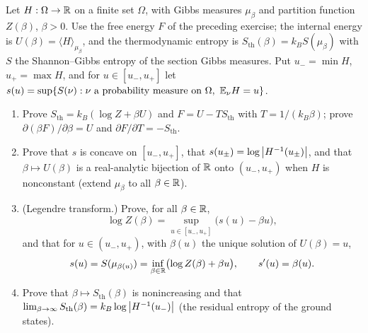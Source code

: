 \begin{exercise}
Let $H:\Omega\to\mathbb R$ on a finite set $\Omega$, with Gibbs measures
$\mu_\beta$ and partition function $Z(\beta)$, $\beta>0$.  Use the free energy $F$ of the preceding exercise; the internal energy is
$U(\beta)=\langle H\rangle_{\mu_\beta}$, and the thermodynamic entropy is
$S_{\mathrm{th}}(\beta)=k_BS(\mu_\beta)$ with $S$ the Shannon--Gibbs entropy
of the section Gibbs measures.  Put $u_-=\min H$, $u_+=\max H$, and for
$u\in[u_-,u_+]$ let
$s(u)=\sup\{S(\nu):\nu\text{ a probability measure on }\Omega,\ \mathbb E_\nu H=u\}$.
\begin{enumerate}[label=(\alph*)]
\item Prove $S_{\mathrm{th}}=k_B(\log Z+\beta U)$ and $F=U-TS_{\mathrm{th}}$
with $T=1/(k_B\beta)$; prove $\partial(\beta F)/\partial\beta=U$ and
$\partial F/\partial T=-S_{\mathrm{th}}$.
\item Prove that $s$ is concave on $[u_-,u_+]$, that $s(u_\pm)=\log\left\lvert H^{-1}(u_\pm)\right\rvert$,
and that $\beta\mapsto U(\beta)$ is a real-analytic bijection of $\mathbb R$ onto
$(u_-,u_+)$ when $H$ is nonconstant (extend $\mu_\beta$ to all $\beta\in\mathbb R$).
\item (Legendre transform.)  Prove, for all $\beta\in\mathbb R$,
\[
 \log Z(\beta)=\sup_{u\in[u_-,u_+]}\bigl(s(u)-\beta u\bigr),
\]
and that for $u\in(u_-,u_+)$, with $\beta(u)$ the unique solution of
$U(\beta)=u$,
\[
 s(u)=S(\mu_{\beta(u)})=\inf_{\beta\in\mathbb R}\bigl(\log Z(\beta)+\beta u\bigr),
 \qquad s'(u)=\beta(u).
\]
\item Prove that $\beta\mapsto S_{\mathrm{th}}(\beta)$ is nonincreasing and
that $\lim_{\beta\to\infty}S_{\mathrm{th}}(\beta)=k_B\log\left\lvert H^{-1}(u_-)\right\rvert$
(the residual entropy of the ground states).
\end{enumerate}
\end{exercise}

